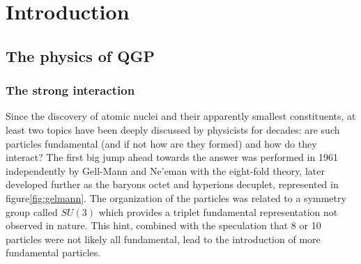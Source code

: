 
\chapter{Introduction}  %





\section{The physics of QGP} %
\subsection{The strong interaction}
Since the discovery of atomic nuclei and their apparently smallest constituents, at least two topics have been deeply discussed by physicists for decades: are such particles fundamental (and if not how are they formed) and how do they interact?
The first big jump ahead towards the answer was performed in 1961 independently by Gell-Mann and Ne'eman with the eight-fold theory, later developed further as the baryons octet and hyperions decuplet, represented in figure\ref{fig:gelmann}.
The organization of the particles was related to a symmetry group called $SU(3)$ which provides a triplet fundamental representation not observed in nature.
This hint, combined with the speculation that 8 or 10 particles were not likely all fundamental, lead to the introduction of more fundamental particles.

